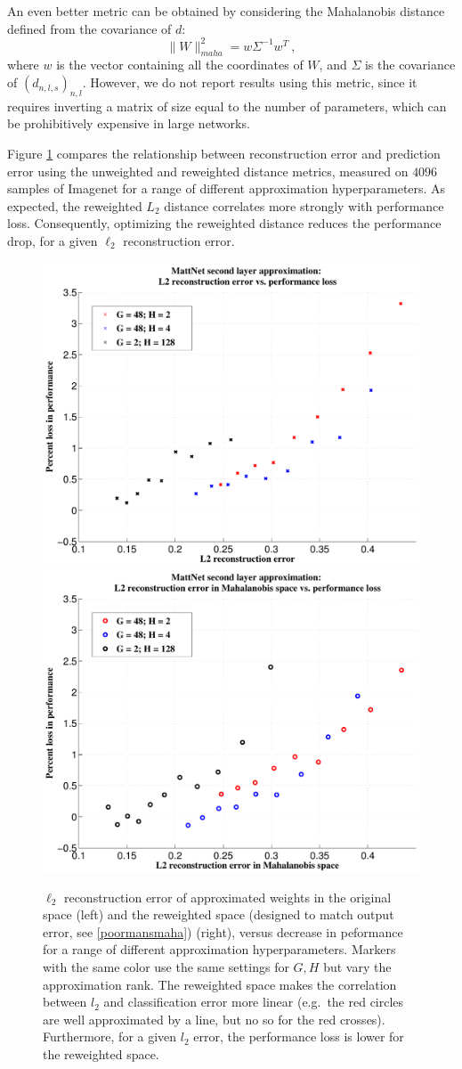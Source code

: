 An even better metric can be obtained by considering the Mahalanobis distance defined from the covariance of 
$d$:
$$\| W \|_{maha}^2 = w \Sigma^{-1} w^T~,$$
where $w$ is the vector containing all the coordinates of $W$, and $\Sigma$ is the covariance of $(d_{n,l,s})_{n,l}$. 
However, we do not report results using this metric, since it requires inverting a matrix of size equal to the number 
of parameters, which can be prohibitively expensive in large networks.

Figure \ref{fig:components} compares the relationship between reconstruction error and prediction error 
using the unweighted and reweighted distance metrics, measured on
$4096$ samples of Imagenet for a range of different approximation hyperparameters.
 As expected, the reweighted $L_2$ distance correlates more strongly with
 performance loss. Consequently, optimizing the reweighted distance
 reduces the performance drop, for a given $\ell_2$ reconstruction error.

\begin{figure}[h]
\centering
\begin{minipage}{0.75\textwidth}
  \includegraphics[width=0.5\linewidth]{img/biclustering_L2_vs_testerr_matt.pdf} 
\quad\quad
  \includegraphics[width=0.5\linewidth]{img/biclustering_L2_vs_testerr_maha_matt.pdf} 
\end{minipage}
\vspace{-3mm}
\caption{$\ell_2$ reconstruction error of approximated weights in the
  original space (left) and the reweighted space (designed to match
  output error, see
  \ref{poormansmaha}) (right), versus decrease in peformance for a
  range of different approximation hyperparameters. Markers with the
  same color use the same settings for $G,H$ but vary the
  approximation rank. The reweighted space makes the correlation
  between $l_2$ and classification error more linear (e.g.~the red
  circles are well approximated by a line, but no so for the red
  crosses). Furthermore, for a given $l_2$ error, the performance loss
  is lower for the reweighted space. }
\label{fig:components}
\end{figure}


